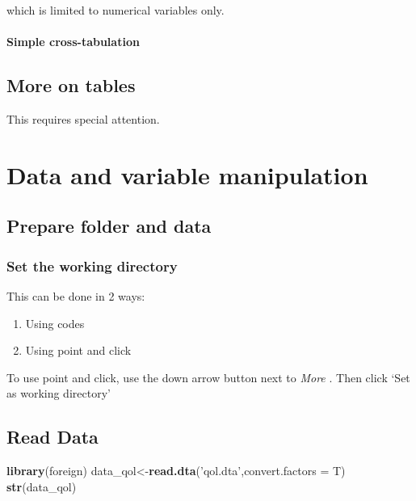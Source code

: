 \documentclass[]{book}
\newenvironment{Shaded}{\begin{snugshade}}{\end{snugshade}}
\newcommand{\KeywordTok}[1]{\textcolor[rgb]{0.13,0.29,0.53}{\textbf{#1}}}
\newcommand{\DataTypeTok}[1]{\textcolor[rgb]{0.13,0.29,0.53}{#1}}
\newcommand{\StringTok}[1]{\textcolor[rgb]{0.31,0.60,0.02}{#1}}
\newcommand{\NormalTok}[1]{#1}
\providecommand{\tightlist}{%
  \setlength{\itemsep}{0pt}\setlength{\parskip}{0pt}}
\theoremstyle{definition}
\theoremstyle{definition}
\theoremstyle{remark}
\begin{document}
which is limited to numerical variables only.

\subsubsection{Simple cross-tabulation}\label{simple-cross-tabulation}

\section{More on tables}\label{more-on-tables}

This requires special attention.

\chapter{Data and variable
manipulation}\label{data-and-variable-manipulation}

\section{Prepare folder and data}\label{prepare-folder-and-data}

\subsection{Set the working directory}\label{set-the-working-directory}

This can be done in 2 ways:

\begin{enumerate}
\def\labelenumi{\arabic{enumi}.}
\tightlist
\item
  Using codes
\item
  Using point and click
\end{enumerate}

To use point and click, use the down arrow button next to \emph{More} .
Then click `Set as working directory'

\section{Read Data}\label{read-data}

\begin{Shaded}
\begin{Highlighting}[]
\KeywordTok{library}\NormalTok{(foreign)}
\NormalTok{data_qol<-}\KeywordTok{read.dta}\NormalTok{(}\StringTok{'qol.dta'}\NormalTok{,}\DataTypeTok{convert.factors =}\NormalTok{ T)}
\KeywordTok{str}\NormalTok{(data_qol)}
\end{Highlighting}
\end{Shaded}
\end{document}

